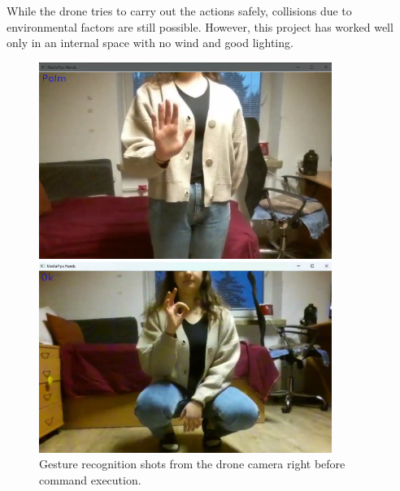 While the drone tries to carry out the actions safely, collisions due to environmental factors are still possible. However, this project has worked well only in an internal space with no wind and good lighting.

\begin{figure}[ht]
	\centering
	\begin{minipage}{0.5\textwidth}
		\centering
		\includegraphics[width=0.85\textwidth]{images/palm_drone.png}
	\end{minipage}%
	\begin{minipage}{0.5\textwidth}
		\centering
		\includegraphics[width=0.85\textwidth]{images/ok_drone.png}
	\end{minipage}
	\caption{Gesture recognition shots from the drone camera right before command execution.}
	\label{fig:drone_detections} %
\end{figure}

